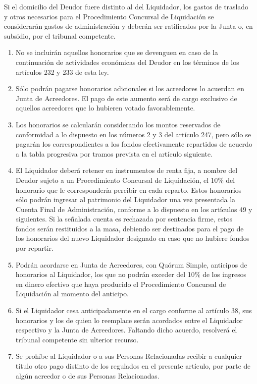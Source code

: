 \documentclass[
]{book}
\begin{document}
Si el domicilio del Deudor fuere distinto al del Liquidador, los gastos de traslado y otros necesarios para el Procedimiento Concursal de Liquidación se considerarán gastos de administración y deberán ser ratificados por la Junta o, en subsidio, por el tribunal competente.

\begin{enumerate}
\def\labelenumi{\arabic{enumi})}
\setcounter{enumi}{2}
\item
  No se incluirán aquellos honorarios que se devenguen en caso de la continuación de actividades económicas del Deudor en los términos de los artículos 232 y 233 de esta ley.
\item
  Sólo podrán pagarse honorarios adicionales si los acreedores lo acuerdan en Junta de Acreedores. El pago de este aumento será de cargo exclusivo de aquellos acreedores que lo hubieren votado favorablemente.
\item
  Los honorarios se calcularán considerando los montos reservados de conformidad a lo dispuesto en los números 2 y 3 del artículo 247, pero sólo se pagarán los correspondientes a los fondos efectivamente repartidos de acuerdo a la tabla progresiva por tramos prevista en el artículo siguiente.
\item
  El Liquidador deberá retener en instrumentos de renta fija, a nombre del Deudor sujeto a un Procedimiento Concursal de Liquidación, el 10\% del honorario que le correspondería percibir en cada reparto. Estos honorarios sólo podrán ingresar al patrimonio del Liquidador una vez presentada la Cuenta Final de Administración, conforme a lo dispuesto en los artículos 49 y siguientes. Si la señalada cuenta es rechazada por sentencia firme, estos fondos serán restituidos a la masa, debiendo ser destinados para el pago de los honorarios del nuevo Liquidador designado en caso que no hubiere fondos por repartir.
\item
  Podrán acordarse en Junta de Acreedores, con Quórum Simple, anticipos de honorarios al Liquidador, los que no podrán exceder del 10\% de los ingresos en dinero efectivo que haya producido el Procedimiento Concursal de Liquidación al momento del anticipo.
\item
  Si el Liquidador cesa anticipadamente en el cargo conforme al artículo 38, sus honorarios y los de quien lo reemplace serán acordados entre el Liquidador respectivo y la Junta de Acreedores. Faltando dicho acuerdo, resolverá el tribunal competente sin ulterior recurso.
\item
  Se prohíbe al Liquidador o a sus Personas Relacionadas recibir a cualquier título otro pago distinto de los regulados en el presente artículo, por parte de algún acreedor o de sus Personas Relacionadas.
\end{enumerate}
\end{document}
